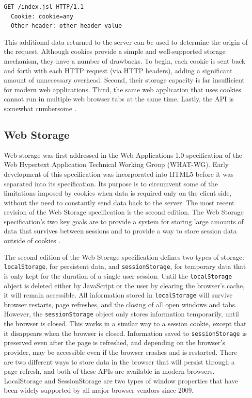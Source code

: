 \begin{lstlisting}[language={}, caption={Cookie HTTP header}, label={lst:cookieHttpHeader}]
  GET /index.jsl HTTP/1.1
  Cookie: cookie=any
  Other-header: other-header-value
\end{lstlisting}

This additional data returned to the server can be used to determine the origin of the request. Although cookies provide a simple and well-supported storage mechanism, they have a number of drawbacks. To begin, each cookie is sent back and forth with each HTTP request (via HTTP headers), adding a significant amount of unnecessary overhead. Second, their storage capacity is far insufficient for modern web applications. Third, the same web application that uses cookies cannot run in multiple web browser tabs at the same time. Lastly, the API is somewhat cumbersome \autocite{kessin2011programming, macdonald2013html5}.

\subsection*{Web Storage}
Web storage was first addressed in the Web Applications 1.0 specification of the Web Hypertext Application Technical Working Group (WHAT-WG). Early development of this specification was incorporated into HTML5 before it was separated into its specification. Its purpose is to circumvent some of the limitations imposed by cookies when data is required only on the client side, without the need to constantly send data back to the server. The most recent revision of the Web Storage specification is the second edition. The Web Storage specification's two key goals are to provide a system for storing large amounts of data that survives between sessions and to provide a way to store session data outside of cookies \autocite{frisbie2019professional}.

The second edition of the Web Storage specification defines two types of storage: \texttt{localStorage}, for persistent data, and \texttt{sessionStorage}, for temporary data that is only kept for the duration of a single user session. Until the \texttt{localStorage} object is deleted either by JavaScript or the user by clearing the browser's cache, it will remain accessible. All information stored in \texttt{localStorage} will survive browser restarts, page refreshes, and the closing of all open windows and tabs. However, the \texttt{sessionStorage} object only stores information temporarily, until the browser is closed. This works in a similar way to a session cookie, except that it disappears when the browser is closed. Information saved to \texttt{sessionStorage} is preserved even after the page is refreshed, and depending on the browser's provider, may be accessible even if the browser crashes and is restarted. There are two different ways to store data in the browser that will persist through a page refresh, and both of these APIs are available in modern browsers. LocalStorage and SessionStorage are two types of window properties that have been widely supported by all major browser vendors since 2009.

